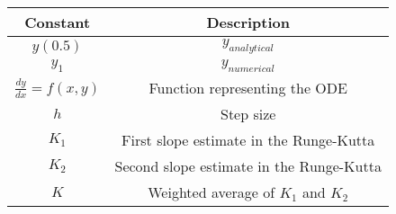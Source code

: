     \begin{tabular}{|c|c|}
        \hline
        \textbf{Constant} & \textbf{Description} \\
        \hline
        $y(0.5)$ & $y_{analytical}$\\
        \hline
        $y_1$ & $y_{numerical}$ \\
        \hline
        $\frac{dy}{dx}=f(x, y)$ & Function representing the ODE\\
        \hline
        $h$ & Step size \\
        \hline
        $K_1$ & First slope estimate in the Runge-Kutta \\
        \hline
        $K_2$ & Second slope estimate in the Runge-Kutta \\
        \hline
        $K$ & Weighted average of $K_1$ and $K_2$ \\
        \hline
    \end{tabular}

